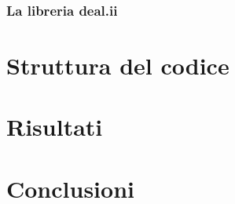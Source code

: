 \documentclass{beamer}
\begin{document}

\begin{frame}
\frametitle{La libreria \textsf{deal.ii}}

\end{frame}


\section{Struttura del codice}

\section{Risultati}

\section{Conclusioni}
\end{document}
